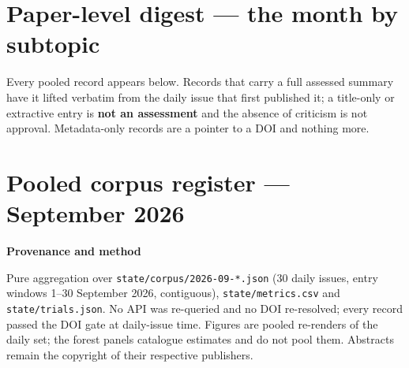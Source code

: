 \documentclass[10pt]{article}
\begin{document}
\clearpage

\section*{\sffamily\bfseries\color{Deep}Paper-level digest --- the month by subtopic}
\vspace{-1.5mm}{\color{Coral}\rule{\linewidth}{1.1pt}}\vspace{2mm}

\footnotesize
Every pooled record appears below. Records that carry a full assessed summary have it lifted
verbatim from the daily issue that first published it; a title-only or extractive entry is
\textbf{not an assessment} and the absence of criticism is not approval. Metadata-only records are a
pointer to a DOI and nothing more.

\vspace{3mm}



\clearpage

\section*{\sffamily\bfseries\color{Deep}Pooled corpus register --- September 2026}
\vspace{-1.5mm}{\color{Coral}\rule{\linewidth}{1.1pt}}\vspace{2.5mm}



\vspace{3mm}

\begin{keybox}
{\sffamily\bfseries\footnotesize\color{Deep}Provenance and method}\\[1.2mm]
{\fontsize{7.2}{8.8}\selectfont
Pure aggregation over \texttt{state/corpus/2026-09-*.json} (30 daily issues, entry windows 1--30
September 2026, contiguous), \texttt{state/metrics.csv} and \texttt{state/trials.json}. No API was
re-queried and no DOI re-resolved; every record passed the DOI gate at daily-issue time. Figures are
pooled re-renders of the daily set; the forest panels catalogue estimates and do not pool them.
Abstracts remain the copyright of their respective publishers.\par}
\end{keybox}
\end{document}
